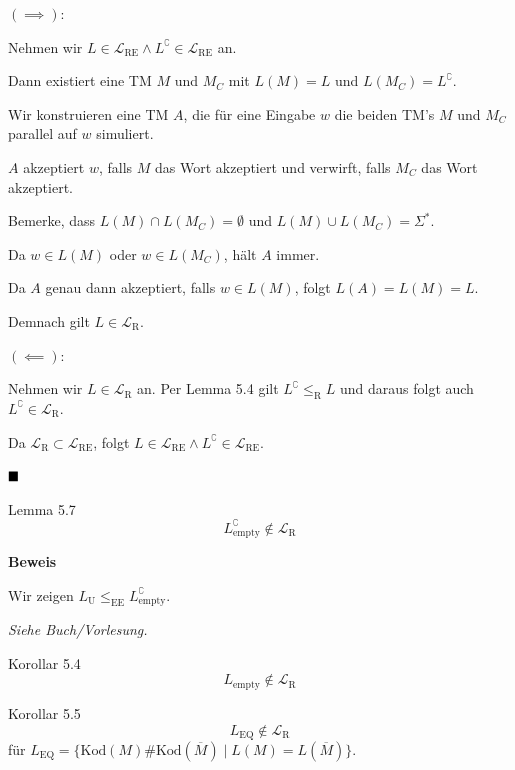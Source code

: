 \documentclass[a4paper, 11pt]{article}
\def\Lre{\mathcal{L}_\text{RE}}
\def\Lr{\mathcal{L}_\text{R}}
\begin{document}
                    $\mathbf{(\implies):}$
                    
                    Nehmen wir $L \in \Lre \land L^\complement \in \Lre$ an.
                
                    Dann existiert eine TM $M$ und $M_C$ mit $L(M) = L$ und $L(M_C) = L^\complement$.
                
                    Wir konstruieren eine TM $A$, die für eine Eingabe $w$ die beiden TM's $M$ und $M_C$ parallel auf $w$ simuliert.
                    
                    $A$ akzeptiert $w$, falls $M$ das Wort akzeptiert und verwirft, falls $M_C$ das Wort akzeptiert.
                    
                    Bemerke, dass $L(M) \cap L(M_C) = \emptyset$ und $L(M) \cup L(M_C) = \Sigma^*$.
                
                    Da $w \in L(M)$ oder $w \in L(M_C)$, hält $A$ immer.
                
                    Da $A$ genau dann akzeptiert, falls $w \in L(M)$, folgt $L(A) = L(M) = L$.
                
                    Demnach gilt $L \in \Lr$.
                
                    
                    $\mathbf{(\impliedby):}$
                
                    Nehmen wir $L \in \Lr$ an. Per Lemma 5.4 gilt $L^\complement \leq_{\text{R}} L$ und daraus folgt auch $L^\complement \in \Lr$.
                
                    Da $\Lr \subset \Lre$, folgt $L \in \Lre \land L^\complement \in \Lre$.
                
                    $\hfill\blacksquare$
                
                
                    \begin{mainbox}{Lemma 5.7}
                        $$L_{\text{empty}}^\complement \notin \Lr$$
                    \end{mainbox}
                    \textbf{Beweis }
                
                    Wir zeigen $L_{\text{U}} \leq_{\text{EE}} L_{\text{empty}}^\complement$.
                
                    \textit{Siehe Buch/Vorlesung.}
                   
                
                    \begin{subbox}{Korollar 5.4}
                        $$L_{\text{empty}} \notin \Lr$$
                    \end{subbox}
                    \begin{subbox}{Korollar 5.5}
                        $$L_{\text{EQ}} \notin \Lr$$
                        für $L_{\text{EQ}} = \{\text{Kod}(M)\#\text{Kod}(\overline{M}) \mid L(M) = L(\overline{M})\}$.
                    \end{subbox}
                
\end{document}
